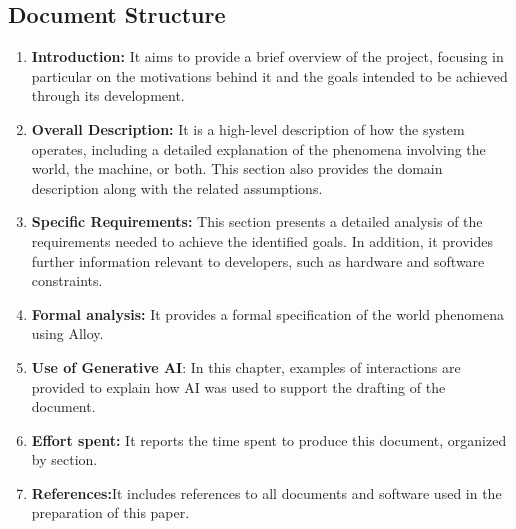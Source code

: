 \subsection{Document Structure}
\begin{enumerate}
    \item \textbf{Introduction:} It aims to provide a brief overview of the project, focusing in particular on the motivations behind it and the goals intended to be achieved through its development.
    \item \textbf{Overall Description:} It is a high-level description of how the system operates, including a detailed explanation of the phenomena involving the world, the machine, or both. This section also provides the domain description along with the related assumptions.
    \item \textbf{Specific Requirements:} This section presents a detailed analysis of the requirements needed to achieve the identified goals. In addition, it provides further information relevant to developers, such as hardware and software constraints.
    \item \textbf{Formal analysis:} It provides a formal specification of the world phenomena using Alloy.
    \item \textbf{Use of Generative AI}: In this chapter, examples of interactions are provided to explain how AI was used to support the drafting of the document.
    \item \textbf{Effort spent:} It reports the time spent to produce this document, organized by section.
    \item \textbf{References:}It includes references to all documents and software used in the preparation of this paper.
\end{enumerate}
 